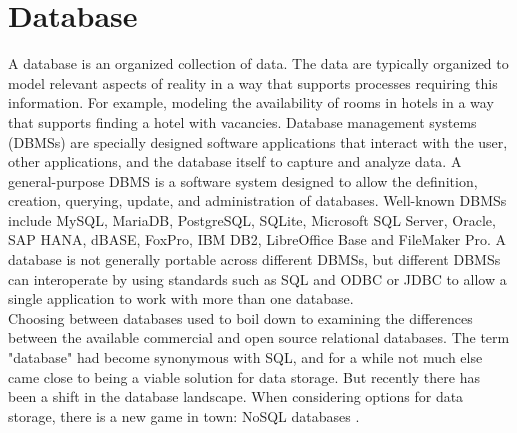 \section{Database}
\hspace*{0.7in} A database is an organized collection of data. The data are typically organized to model relevant aspects of reality in a way that supports processes requiring this information. For example, modeling the availability of rooms in hotels in a way that supports finding a hotel with vacancies. Database management systems (DBMSs) are specially designed software applications that interact with the user, other applications, and the database itself to capture and analyze data. A general-purpose DBMS is a software system designed to allow the definition, creation, querying, update, and administration of databases. Well-known DBMSs include MySQL, MariaDB, PostgreSQL, SQLite, Microsoft SQL Server, Oracle, SAP HANA, dBASE, FoxPro, IBM DB2, LibreOffice Base and FileMaker Pro. A database is not generally portable across different DBMSs, but different DBMSs can interoperate by using standards such as SQL and ODBC or JDBC to allow a single application to work with more than one database. \cite{1}\\
\hspace*{0.7in} Choosing between databases used to boil down to examining the differences between the available commercial and open source relational databases. The term "database" had become synonymous with SQL, and for a while not much else came close to being a viable solution for data storage. But recently there has been a shift in the database landscape. When considering options for data storage, there is a new game in town: NoSQL databases \cite{2}.

